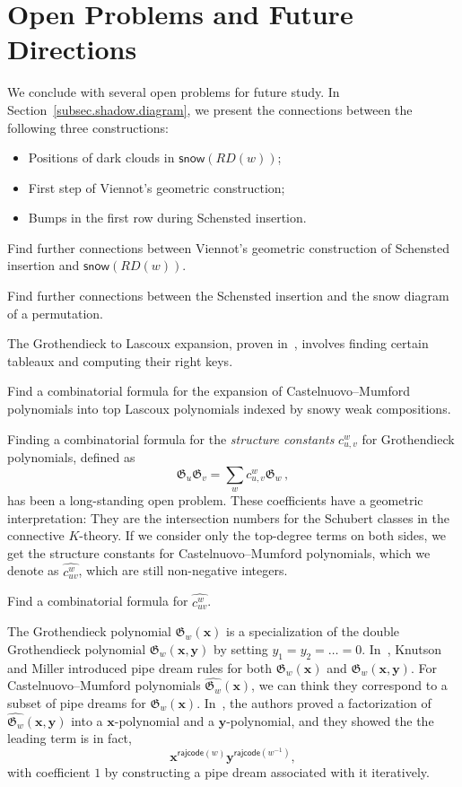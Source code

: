 \documentclass[ALCO]{cedram}
\newcommand{\fG}{\mathfrak{G}}
\newcommand{\snow}{\mathsf{snow}}
\newcommand{\rajcode}{\mathsf{rajcode}}
\newcommand{\definition}[1]{{\color{darkred}\emph{#1}}}
\begin{document}
\section{Open Problems and Future Directions}\label{sec.open}
We conclude with several open problems for future study.
In Section~\ref{subsec.shadow.diagram}, we present the connections between the
following three constructions:
\begin{itemize}
\item[-] Positions of dark clouds in $\snow(RD(w))$;
\item[-] First step of Viennot's geometric construction;
\item[-] Bumps in the first row during Schensted insertion. 
\end{itemize}

\begin{prob}
Find further connections between Viennot's geometric  construction of Schensted insertion
and $\snow(RD(w))$.
\end{prob}

\begin{prob}
Find further connections between the Schensted insertion and the snow diagram of a permutation.
\end{prob}

The Grothendieck to Lascoux expansion, proven in~\cite{SY}, 
involves finding certain tableaux and computing their right keys.


\begin{prob}
Find a combinatorial formula for the expansion of Castelnuovo--Mumford polynomials
into top Lascoux polynomials indexed by snowy weak compositions. 
\end{prob}

Finding a combinatorial formula for the \definition{structure constants} $c^w_{u,v}$ 
for Grothendieck polynomials, defined as
\[
\fG_u \fG_v = \sum_{w} c^w_{u,v}\fG_w\,,
\] 
has been a long-standing open problem.
These coefficients have a geometric interpretation: They are the intersection 
numbers for the Schubert classes in the connective $K$-theory. 
If we consider only the top-degree terms on both sides, we get the structure 
constants for Castelnuovo--Mumford polynomials, which we denote as $\widehat{c^w_{uv}}$,
which are still non-negative integers.


\begin{prob}
Find a combinatorial formula for $\widehat{c^w_{uv}}$.
\end{prob}

The Grothendieck polynomial $\fG_w(\bm{x})$ is a specialization of the double 
Grothendieck polynomial $\fG_w(\bm{x},\bm{y})$ by setting $y_1=y_2 = \dots = 0$. 
In~\cite{KM}, Knutson and Miller introduced pipe dream rules for both
$\fG_w(\bm{x})$ and $\fG_w(\bm{x},\bm{y})$.
For Castelnuovo--Mumford polynomials $\widehat{\fG_w}(\bm{x})$, we can think they 
correspond to a subset of pipe dreams for $\fG_w(\bm{x})$.
In~\cite{PSW}, the authors proved a factorization of $\widehat{\fG_w}(\bm{x},\bm{y})$
into a $\bm{x}$-polynomial and a $\bm{y}$-polynomial, and they showed the 
the leading term is in fact,
\[
\bm{x}^{\rajcode(w)} \bm{y}^{\rajcode(w^{-1})},
\]
with coefficient $1$ by constructing a pipe dream associated with it iteratively.
\end{document}
